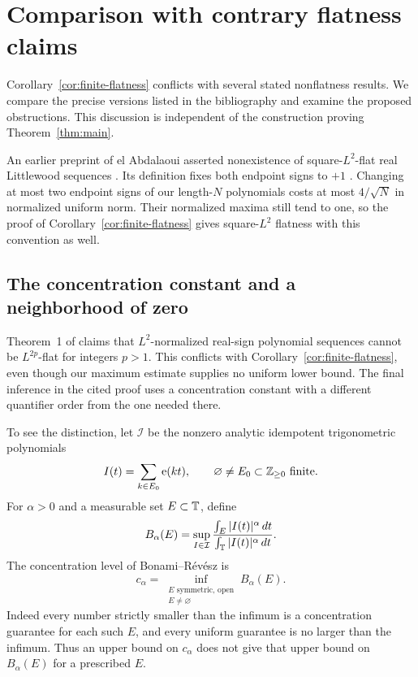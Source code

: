 \section{Comparison with contrary flatness claims}\label{sec:concentration}

Corollary~\ref{cor:finite-flatness} conflicts with several stated
nonflatness results. We compare the precise versions listed in the
bibliography and examine the proposed obstructions. This discussion is
independent of the construction proving Theorem~\ref{thm:main}.

An earlier preprint of el Abdalaoui asserted nonexistence of
square-$L^2$-flat real Littlewood sequences
\cite[Theorem~3.3]{ElAbdalaoui2017}. Its definition fixes both endpoint
signs to $+1$ \cite[Equation~(2.1)]{ElAbdalaoui2017}. Changing at most
two endpoint signs of our length-$N$ polynomials costs at most
$4/\sqrt N$ in normalized uniform norm. Their normalized maxima still
tend to one, so the proof of Corollary~\ref{cor:finite-flatness} gives
square-$L^2$ flatness with this convention as well.

\subsection{The concentration constant and a neighborhood of zero}
Theorem~1 of \cite{ElAbdalaoui2025} claims that $L^2$-normalized real-sign
polynomial sequences cannot be $L^{2p}$-flat for integers $p>1$. This conflicts with
Corollary~\ref{cor:finite-flatness}, even though our maximum estimate
supplies no uniform lower bound. The final inference in the cited proof
uses a concentration constant with a different quantifier order from
the one needed there.

To see the distinction, let $\mathcal I$ be the nonzero analytic
idempotent trigonometric polynomials
\[
 I(t)=\sum_{k\in E_0}\mathrm e(kt),
 \qquad \varnothing\ne E_0\subset\mathbb Z_{\ge0}\text{ finite}.
\]
For $\alpha>0$ and a measurable set $E\subset\mathbb T$, define
\[
 B_\alpha(E)=\sup_{I\in\mathcal I}
      \frac{\int_E|I(t)|^\alpha\,dt}{\int_{\mathbb T}|I(t)|^\alpha\,dt}.
\]
The concentration level of Bonami--R\'ev\'esz is
\cite[Definitions 1--2]{BonamiRevesz2008}
\begin{equation}\label{eq:concentration-infimum}
 c_\alpha=\inf_{\substack{E\text{ symmetric, open}\\E\ne\varnothing}}
                B_\alpha(E).
\end{equation}
Indeed every number strictly smaller than the infimum is a concentration
guarantee for each such $E$, and every uniform guarantee is no larger
than the infimum. Thus an upper bound on $c_\alpha$ does not give that
upper bound on $B_\alpha(E)$ for a prescribed $E$.

